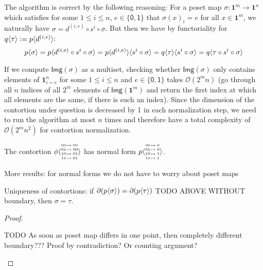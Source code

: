 \documentclass{llncs}
\newcommand{\continuation}{??}
\newenvironment{examplecontd}[1]
{\renewcommand{\continuation}{\ref{#1}}\expcont[continued]}
{\endexpcont}
\newcommand{\todo}[1]{
  \begin{tcolorbox}
    TODO {#1} 
  \end{tcolorbox}
}
\newcommand{\mdef}{:=}
\newcommand{\pint}[1]{\mathbf{1}^{#1}}
\newcommand{\pintrestr}[3]{\mathbf{1}^{#1}_{{#2}={#3}}}
\newcommand{\izero}{\mathsf{0}}
\newcommand{\ione}{\mathsf{1}}
\newcommand{\image}[1]{\textsf{Img}({#1})}
\newcommand{\smap}[1]{s^{{#1}}}
\newcommand{\dmap}[2]{d^{({#1} , {#2})}}
\newcommand{\cont}[2]{\ensuremath{ \ifthenelse{\equal{#2}{}}{#1}{{#1}\langle{#2}\rangle}} }
\newcommand{\boundary}[1]{\partial({#1})}
\newcommand{\substfour}[4]{\tiny
  \arraycolsep=.4pt\def\arraystretch{1}
  \begin{array}{ll}
    00 &\mapsto {#1} \\
    01 &\mapsto {#2} \\
    10 &\mapsto {#3} \\
    11 &\mapsto {#4} 
  \end{array}
}
\begin{document}
The algorithm is correct by the following reasoning: For a poset map $\sigma :
\pint{m} \to \pint{n}$ which satisfies for some $1 \leq i \leq n$, $e \in
\{\izero, \ione\}$ that $\sigma(x)_i = e$ for all $x \in \pint{m}$, we naturally
have $\sigma = \dmap{i}{e} \circ \smap{i} \circ \sigma$.
But then we have by functoriality for $\cont{q}{\tau} \mdef \cont{p}{\dmap{i}{e}}$:
$$\cont{p}{\sigma} = \cont{p}{\dmap{i}{e} \circ \smap{i} \circ \sigma} =
\cont{\cont{p}{\dmap{i}{e}}}{\smap{i} \circ \sigma} =
\cont{\cont{q}{\tau}}{\smap{i} \circ \sigma} = \cont{q}{\tau \circ \smap{i} \circ \sigma}$$


If we compute $\image{\sigma}$ as a multiset, checking whether 
$\image{\sigma}$ only contains elements of $\pintrestr{n}{i}{e}$ for
some $1 \leq i \leq n$ and $e \in \{\izero,\ione\}$ takes $\mathcal{O}(2^mn)$
(go through all $n$ indices of all $2^m$ elements of $\image{\pint{m}}$ and
return the first index at which all elements are the same, if there is such an index).
Since the dimension of the contortion under question is decreased by 1 in each
normalization step, we need to run the algorithm at most $n$ times and therefore
have a total complexity of $\mathcal{O}(2^mn^2)$ for contortion normalization.

\begin{examplecontd}{exp:triangle}
  The contortion $\cont{\phi}{\substfour{00}{00}{01}{01}}$ has normal form $\cont{p}{\substfour{0}{0}{1}{1}}$.
\end{examplecontd}

More results: for normal forms we do not have to worry about poset maps

\begin{proposition}
  Uniqueness of contortions: if $\boundary{\cont{p}{\sigma}} =
  \boundary{\cont{p}{\tau}}$ TODO ABOVE WITHOUT boundary, then $\sigma = \tau$.

  \begin{proof}
    \todo{As soon as poset map differs in one point, then completely different
      boundary??? Proof by contradiction? Or counting argument?}
  \end{proof}
\end{proposition}
\end{document}
